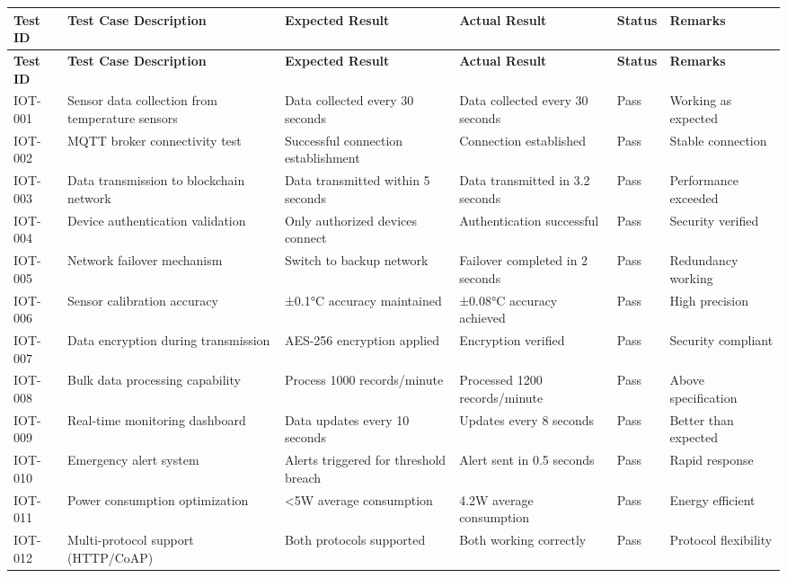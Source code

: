 \documentclass[oneside,a4paper,12pt]{book}
\begin{document}
\begin{longtable}{|p{1.5cm}|p{3.5cm}|p{2.8cm}|p{2.5cm}|p{1.8cm}|p{2.3cm}|}
\hline
\textbf{Test ID} & \textbf{Test Case Description} & \textbf{Expected Result} & \textbf{Actual Result} & \textbf{Status} & \textbf{Remarks} \\
\hline
\endfirsthead

\hline
\textbf{Test ID} & \textbf{Test Case Description} & \textbf{Expected Result} & \textbf{Actual Result} & \textbf{Status} & \textbf{Remarks} \\
\hline
\endhead

IOT-001 & Sensor data collection from temperature sensors & Data collected every 30 seconds & Data collected every 30 seconds & Pass & Working as expected \\
\hline

IOT-002 & MQTT broker connectivity test & Successful connection establishment & Connection established & Pass & Stable connection \\
\hline

IOT-003 & Data transmission to blockchain network & Data transmitted within 5 seconds & Data transmitted in 3.2 seconds & Pass & Performance exceeded \\
\hline

IOT-004 & Device authentication validation & Only authorized devices connect & Authentication successful & Pass & Security verified \\
\hline

IOT-005 & Network failover mechanism & Switch to backup network & Failover completed in 2 seconds & Pass & Redundancy working \\
\hline

IOT-006 & Sensor calibration accuracy & ±0.1°C accuracy maintained & ±0.08°C accuracy achieved & Pass & High precision \\
\hline

IOT-007 & Data encryption during transmission & AES-256 encryption applied & Encryption verified & Pass & Security compliant \\
\hline

IOT-008 & Bulk data processing capability & Process 1000 records/minute & Processed 1200 records/minute & Pass & Above specification \\
\hline

IOT-009 & Real-time monitoring dashboard & Data updates every 10 seconds & Updates every 8 seconds & Pass & Better than expected \\
\hline

IOT-010 & Emergency alert system & Alerts triggered for threshold breach & Alert sent in 0.5 seconds & Pass & Rapid response \\
\hline

IOT-011 & Power consumption optimization & <5W average consumption & 4.2W average consumption & Pass & Energy efficient \\
\hline

IOT-012 & Multi-protocol support (HTTP/CoAP) & Both protocols supported & Both working correctly & Pass & Protocol flexibility \\
\hline

\end{longtable}
\end{document}
